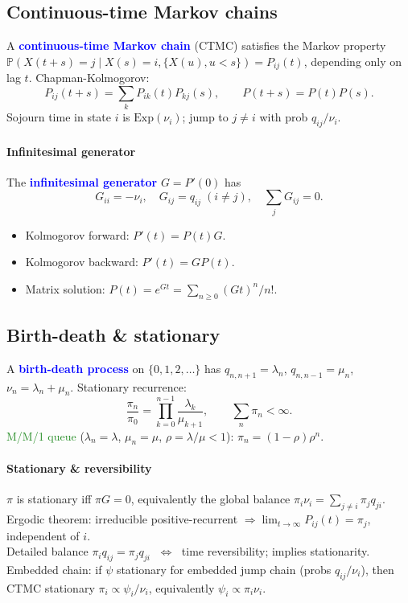 \subsection{Continuous-time Markov chains}
A \textcolor{Blue}{\textbf{continuous-time Markov chain}} (CTMC) satisfies the
\textcolor{Bittersweet}{Markov property}
$\mathbb{P}(X(t+s)=j\mid X(s)=i,\{X(u),u<s\})=P_{ij}(t)$, depending only on lag
$t$. \textcolor{Bittersweet}{Chapman-Kolmogorov}:
\[P_{ij}(t+s)=\sum_k P_{ik}(t)P_{kj}(s),\qquad P(t+s)=P(t)P(s).\]
\textcolor{Bittersweet}{Sojourn time} in state $i$ is
$\mathrm{Exp}(\nu_i)$; jump to $j\ne i$ with prob $q_{ij}/\nu_i$.

\paragraph{Infinitesimal generator}
The \textcolor{Blue}{\textbf{infinitesimal generator}} $G=P'(0)$ has
\[G_{ii}=-\nu_i,\quad G_{ij}=q_{ij}\;(i\ne j),\quad \textstyle\sum_j G_{ij}=0.\]
\begin{itemize}
  \item \textcolor{Bittersweet}{Kolmogorov forward}: $P'(t)=P(t)G$.
  \item \textcolor{Bittersweet}{Kolmogorov backward}: $P'(t)=GP(t)$.
  \item Matrix solution: $P(t)=e^{Gt}=\sum_{n\ge 0}(Gt)^n/n!$.
\end{itemize}

\subsection{Birth-death \& stationary}
A \textcolor{Blue}{\textbf{birth-death process}} on $\{0,1,2,\ldots\}$ has
$q_{n,n+1}=\lambda_n$, $q_{n,n-1}=\mu_n$, $\nu_n=\lambda_n+\mu_n$.
\textcolor{Bittersweet}{Stationary recurrence}:
\[\frac{\pi_n}{\pi_0}=\prod_{k=0}^{n-1}\frac{\lambda_k}{\mu_{k+1}},\qquad
\textstyle\sum_n\pi_n<\infty.\]
\textcolor{ForestGreen}{M/M/1 queue} ($\lambda_n=\lambda$, $\mu_n=\mu$,
$\rho=\lambda/\mu<1$): $\pi_n=(1-\rho)\rho^n$.

\paragraph{Stationary \& reversibility}
$\pi$ is \textcolor{Bittersweet}{stationary} iff $\pi G=0$, equivalently the
\textcolor{Bittersweet}{global balance}
$\pi_i\nu_i=\sum_{j\ne i}\pi_j q_{ji}$. \textcolor{Bittersweet}{Ergodic
theorem}: irreducible positive-recurrent $\Rightarrow
\lim_{t\to\infty}P_{ij}(t)=\pi_j$, independent of $i$.\\
\textcolor{Bittersweet}{Detailed balance}
$\pi_i q_{ij}=\pi_j q_{ji}$ $\;\Leftrightarrow\;$
\textcolor{Bittersweet}{time reversibility}; implies stationarity.\\
\textcolor{Bittersweet}{Embedded chain}: if $\psi$ stationary for embedded jump chain
(probs $q_{ij}/\nu_i$), then CTMC stationary $\pi_i\propto\psi_i/\nu_i$, equivalently
$\psi_i\propto\pi_i\nu_i$.

